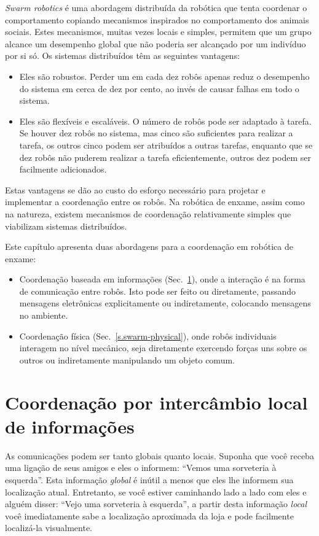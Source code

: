 \emph{Swarm robotics} é uma abordagem distribuída da robótica que tenta coordenar o comportamento copiando mecanismos inspirados no comportamento dos animais sociais. Estes mecanismos, muitas vezes locais e simples, permitem que um grupo alcance um desempenho global que não poderia ser alcançado por um indivíduo por si só. Os sistemas distribuídos têm as seguintes vantagens:
\begin{itemize}
\item Eles são robustos. Perder um em cada dez robôs apenas reduz o desempenho do sistema em cerca de dez por cento, ao invés de causar falhas em todo o sistema.
\item Eles são flexíveis e escaláveis. O número de robôs pode ser adaptado à tarefa. Se houver dez robôs no sistema, mas cinco são suficientes para realizar a tarefa, os outros cinco podem ser atribuídos a outras tarefas, enquanto que se dez robôs não puderem realizar a tarefa eficientemente, outros dez podem ser facilmente adicionados.
\end{itemize}
Estas vantagens se dão ao custo do esforço necessário para projetar e implementar a coordenação entre os robôs. Na robótica de enxame, assim como na natureza, existem mecanismos de coordenação relativamente simples que viabilizam sistemas distribuídos.

Este capítulo apresenta duas abordagens para a coordenação em robótica de enxame:
\begin{itemize}
\item Coordenação baseada em informações (Sec.~\ref{s.swarm-info}), onde a interação é na forma de comunicação entre robôs. Isto pode ser feito ou diretamente, passando mensagens eletrônicas explicitamente ou indiretamente, colocando mensagens no ambiente.
\item Coordenação física (Sec.~\ref{s.swarm-physical}), onde robôs individuais interagem no nível mecânico, seja diretamente exercendo forças uns sobre os outros ou indiretamente manipulando um objeto comum.
\end{itemize}

\section{Coordenação por intercâmbio local de informações}\label{s.swarm-info}

As comunicações podem ser tanto globais quanto locais. Suponha que você receba uma ligação de seus amigos e eles o informem: ``Vemos uma sorveteria à esquerda''. Esta informação \emph{global} é inútil a menos que eles lhe informem sua localização atual. Entretanto, se você estiver caminhando lado a lado com eles e alguém disser: ``Vejo uma sorveteria à esquerda'', a partir desta informação \emph{local} você imediatamente sabe a localização aproximada da loja e pode facilmente localizá-la visualmente.

